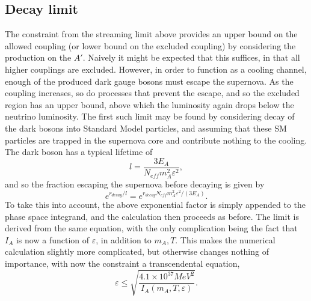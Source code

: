 \documentclass[nofootinbib,prd,superscriptaddress,twocolumn]{revtex4}
\newcommand{\beq}{\begin{equation}}
\newcommand{\eeq}{\end{equation}}
\begin{document}
\subsection{Decay limit}
The constraint from the streaming limit above provides an upper bound on the allowed coupling (or lower bound on the excluded coupling) by considering the production on the $A'$. Naively it might be expected that this suffices, in that all higher couplings are excluded. However, in order to function as a cooling channel, enough of the produced dark gauge bosons must escape the supernova. As the coupling increases, so do processes that prevent the escape, and so the excluded region has an upper bound, above which the luminosity again drops below the neutrino luminosity. The first such limit may be found by considering decay of the dark bosons into Standard Model particles, and assuming that these SM particles are trapped in the supernova core and contribute nothing to the cooling. The dark boson has a typical lifetime of 
\beq
l = \frac{3 E_{A}}{N_{eff} m_A^2 \varepsilon^2},
\eeq
and so the fraction escaping the supernova before decaying is given by 
\beq
e^{r_{decay}/l} = e^{r_{decay} N_{eff} m_A^2 \varepsilon^2/(3 E_A)}.
\eeq
To take this into account, the above exponential factor is simply appended to the phase space integrand, and the calculation then proceeds as before. The limit is derived from the same equation, with the only complication being the fact that $ I_A $ is now a function of $ \varepsilon $, in addition to $ m_A, T $. This makes the numerical calculation slightly more complicated, but otherwise changes nothing of importance, with now the constraint a transcendental equation,  
\beq
\varepsilon \le \sqrt{\frac{4.1 \times 10^{37} MeV^2}{I_A(m_A, T, \varepsilon)}}.
\eeq
	

\end{document}
